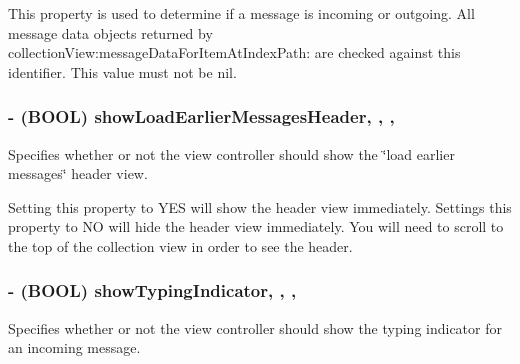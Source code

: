 This property is used to determine if a message is incoming or outgoing. All message data objects returned by {\ttfamily collection\+View\+:message\+Data\+For\+Item\+At\+Index\+Path\+:} are checked against this identifier. This value must not be {\ttfamily nil}. \hypertarget{interface_j_s_q_messages_view_controller_a9d7705d74b5543259ad21013b317b0d3}{}
\subsubsection[{show\+Load\+Earlier\+Messages\+Header}]{\setlength{\rightskip}{0pt plus 5cm}-\/ (B\+O\+O\+L) show\+Load\+Earlier\+Messages\+Header\hspace{0.3cm}{\ttfamily [read]}, {\ttfamily [write]}, {\ttfamily [nonatomic]}, {\ttfamily [assign]}}\label{interface_j_s_q_messages_view_controller_a9d7705d74b5543259ad21013b317b0d3}
Specifies whether or not the view controller should show the \char`\"{}load earlier messages\char`\"{} header view.

Setting this property to {\ttfamily Y\+E\+S} will show the header view immediately. Settings this property to {\ttfamily N\+O} will hide the header view immediately. You will need to scroll to the top of the collection view in order to see the header. \hypertarget{interface_j_s_q_messages_view_controller_ad1eded3a8cfe024fb2914e9250cd2cc8}{}
\subsubsection[{show\+Typing\+Indicator}]{\setlength{\rightskip}{0pt plus 5cm}-\/ (B\+O\+O\+L) show\+Typing\+Indicator\hspace{0.3cm}{\ttfamily [read]}, {\ttfamily [write]}, {\ttfamily [nonatomic]}, {\ttfamily [assign]}}\label{interface_j_s_q_messages_view_controller_ad1eded3a8cfe024fb2914e9250cd2cc8}
Specifies whether or not the view controller should show the typing indicator for an incoming message.

